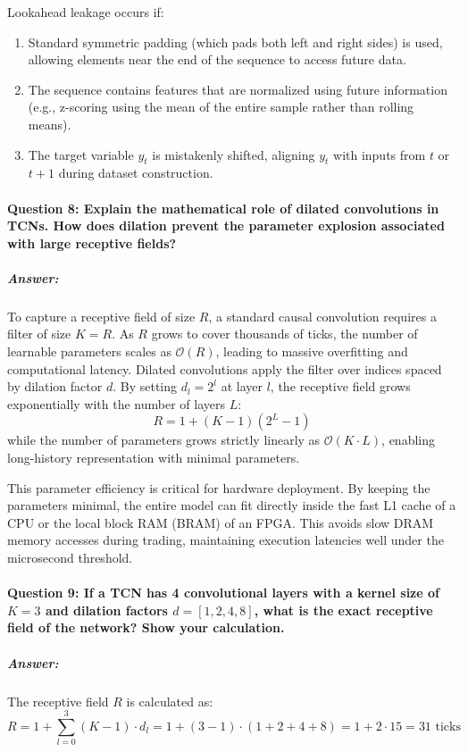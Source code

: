 \documentclass[11pt,a4paper]{article}
\begin{document}
Lookahead leakage occurs if:
\begin{enumerate}
    \item Standard symmetric padding (which pads both left and right sides) is used, allowing elements near the end of the sequence to access future data.
    \item The sequence contains features that are normalized using future information (e.g., z-scoring using the mean of the entire sample rather than rolling means).
    \item The target variable $y_t$ is mistakenly shifted, aligning $y_{t}$ with inputs from $t$ or $t+1$ during dataset construction.
\end{enumerate}

\paragraph{Question 8: Explain the mathematical role of dilated convolutions in TCNs. How does dilation prevent the parameter explosion associated with large receptive fields?}
\subparagraph{Answer:}
To capture a receptive field of size $R$, a standard causal convolution requires a filter of size $K = R$. As $R$ grows to cover thousands of ticks, the number of learnable parameters scales as $\mathcal{O}(R)$, leading to massive overfitting and computational latency.
Dilated convolutions apply the filter over indices spaced by dilation factor $d$. By setting $d_l = 2^l$ at layer $l$, the receptive field grows exponentially with the number of layers $L$:
\begin{equation}
    R = 1 + (K - 1)(2^L - 1)
\end{equation}
while the number of parameters grows strictly linearly as $\mathcal{O}(K \cdot L)$, enabling long-history representation with minimal parameters.

This parameter efficiency is critical for hardware deployment. By keeping the parameters minimal, the entire model can fit directly inside the fast L1 cache of a CPU or the local block RAM (BRAM) of an FPGA. This avoids slow DRAM memory accesses during trading, maintaining execution latencies well under the microsecond threshold.

\paragraph{Question 9: If a TCN has 4 convolutional layers with a kernel size of $K=3$ and dilation factors $d = [1, 2, 4, 8]$, what is the exact receptive field of the network? Show your calculation.}
\subparagraph{Answer:}
The receptive field $R$ is calculated as:
\begin{equation}
    R = 1 + \sum_{l=0}^{3} (K - 1) \cdot d_l = 1 + (3 - 1) \cdot (1 + 2 + 4 + 8) = 1 + 2 \cdot 15 = 31 \text{ ticks}
\end{equation}
\end{document}
